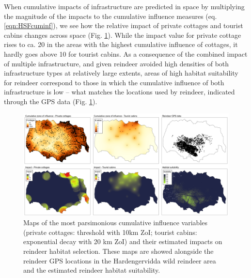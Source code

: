 \documentclass[titlepage]{article}
\begin{document}
When cumulative impacts of infrastructure are predicted in space by multiplying the magnitude of the impacts to the cumulative influence measures (eq. \ref{eqn:HSFcuminf}), we see how the relative impact of private cottages and tourist cabins changes across space (Fig. \ref{fig:prediction_maps}). While the impact value for private cottage rises to ca. 20 in the areas with the highest cumulative influence of cottages, it hardly goes above 10 for tourist cabins. As a consequence of the combined impact of multiple infrastructure, and given reindeer
avoided high densities of both infrastructure types at relatively large extents, 
areas of high habitat suitability for reindeer correspond to those in which the
cumulative influence of both infrastructure is low -- what matches the
locations used by reindeer, indicated through the GPS data (Fig. \ref{fig:prediction_maps}).

\begin{figure}[h]
\centering
\includegraphics[width=1.3\textwidth,center]{figures/reindeer_results_prediction_maps.png}
\caption{\label{fig:prediction_maps} Maps of the most parsimonious cumulative influence variables (private cottages: threshold with 10km ZoI; tourist cabins: exponential decay with 20 km ZoI) and their estimated impacts on reindeer habitat selection. These maps are showed alongside the reindeer GPS locations in the Hardengervidda wild reindeer area and the estimated reindeer habitat suitability.}
\end{figure}

\end{document}
